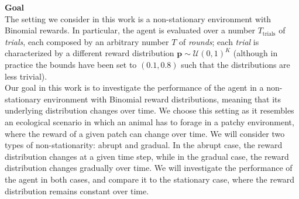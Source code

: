 \hfill \break
\textbf{Goal} \\
\noindent The setting we consider in this work is a non-stationary environment with Binomial rewards. In particular, the agent is evaluated over a number $T_{\text{trials}}$ of \textit{trials}, each composed by an arbitrary number $T$ of \textit{rounds}; each \textit{trial} is characterized by a different
reward distribution $\mathbf{p}\sim\mathcal{U}(0,1)^{K}$ (although in practice the bounds have been set to $(0.1, 0.8)$ such that the distributions are less trivial). \\
\noindent Our goal in this work is to investigate the performance of the agent in a non-stationary environment with Binomial reward distributions, meaning that its underlying distribution changes over time. We choose this setting as it resembles an ecological scenario in which an animal has to forage in a patchy environment, where the reward of a given patch can change over time. We will consider two types of non-stationarity: abrupt and gradual. In the abrupt case, the reward distribution changes at a given time step, while in the gradual case, the reward distribution changes gradually over time. We will investigate the performance of the agent in both cases, and compare it to the stationary case, where the reward distribution remains constant over time.





